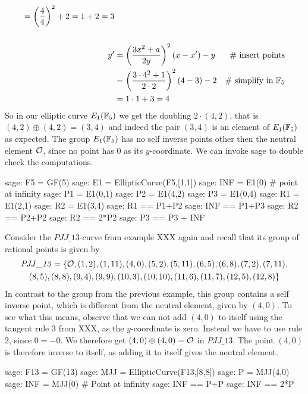 \begin{example}
\begin{align*}
      = \left(\frac{4}{4}\right)^2 +2
      = 1 +2
      = 3
\\
\\
y'  & = \left(\frac{3x^2+a}{2y}\right)^2\left(x-x'\right) - y  & \text{\# insert points} \\
    & = \left(\frac{3\cdot 4^2+1}{2\cdot 2}\right)^2\left(4-3\right) - 2 & \text{\# simplify in } \mathbb{F}_5\\
    & = 1\cdot 1 + 3
      = 4
\end{align*}
So in our elliptic curve $E_1(\mathbb{F}_5)$ we get the doubling $2\cdot (4,2)$, that is $(4,2)\oplus (4,2) =(3,4)$ and indeed the pair $(3,4)$ is an element of $E_1(\mathbb{F}_5)$ as expected. The group $E_1(\mathbb{F}_5)$ has no self inverse points other then the neutral element $\mathcal{O}$, since no point has $0$ as its $y$-coordinate. We can invoke sage to double check the computations.
\begin{sagecommandline}
sage: F5 = GF(5)
sage: E1 = EllipticCurve(F5,[1,1])
sage: INF = E1(0) # point at infinity
sage: P1 = E1(0,1)
sage: P2 = E1(4,2)
sage: P3 = E1(0,4)
sage: R1 = E1(2,1)
sage: R2 = E1(3,4)
sage: R1 == P1+P2
sage: INF == P1+P3
sage: R2 == P2+P2
sage: R2 == 2*P2
sage: P3 == P3 + INF
\end{sagecommandline}
\end{example}
\begin{example} Consider the $\mathit{PJJ\_13}$-curve from example XXX again and recall that its group of rational points is given by
\begin{multline*}
\mathit{PJJ\_13} = \{\mathcal{O}, (1, 2), (1, 11), (4, 0), (5, 2), (5, 11), (6, 5), (6, 8), (7,2), (7, 11), \\ (8, 5), (8, 8), (9, 4), (9, 9), (10, 3), (10,
10), (11, 6), (11, 7), (12, 5), (12, 8)\}
\end{multline*}
In contrast to the group from the previous example, this group contains a self inverse point, which is different from the neutral element, given by $(4,0)$. To see what this means, observe that we can not add $(4,0)$ to itself using the tangent rule 3 from XXX, as the $y$-coordinate is zero. Instead we have to use rule 2, since $0=-0$. We therefore get $(4,0)\oplus (4,0)=\mathcal{O}$ in $\mathit{PJJ\_13}$. The point $(4,0)$ is therefore inverse to itself, as adding it to itself gives the neutral element.
\begin{sagecommandline}
sage: F13 = GF(13)
sage: MJJ = EllipticCurve(F13,[8,8])
sage: P = MJJ(4,0)
sage: INF = MJJ(0) # Point at infinity
sage: INF == P+P
sage: INF == 2*P
\end{sagecommandline}
\end{example}
